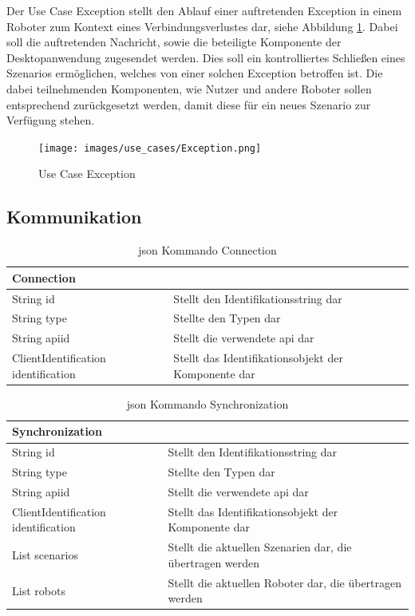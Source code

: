Der Use Case Exception stellt den Ablauf einer auftretenden Exception in einem Roboter zum Kontext eines Verbindungsverlustes dar, siehe Abbildung \ref{fig:Exception}. Dabei soll die auftretenden Nachricht, sowie die beteiligte Komponente der Desktopanwendung zugesendet werden. Dies soll ein kontrolliertes Schließen eines Szenarios ermöglichen, welches von einer solchen Exception betroffen ist. Die dabei teilnehmenden Komponenten, wie Nutzer und andere Roboter sollen entsprechend zurückgesetzt werden, damit diese für ein neues Szenario zur Verfügung stehen.\\

\begin{figure}[h]
	\begin{center}
		\texttt{[image: images/use\_cases/Exception.png]}
	\end{center}
	\caption{Use Case Exception}
	\label{fig:Exception}
\end{figure}

\newpage
\color{process}
\subsection{Kommunikation}

\begin{table}[h]
	\centering
	\begin{tabular}{|p{4cm}|p{10cm}|}
		\hline
		\textbf{Connection} & \\
		\hline
		String id & Stellt den Identifikationsstring dar \\
		String type & Stellte den Typen dar \\
		String apiid & Stellt die verwendete \gls{api} dar \\
		ClientIdentification identification & Stellt das Identifikationsobjekt der Komponente dar \\
		\hline
	\end{tabular}
	\caption[\gls{json} Kommando Connection]{\gls{json} Kommando Connection}
	\label{tab:Connection}
\end{table}

\begin{table}[h]
	\centering
	\begin{tabular}{|p{4cm}|p{10cm}|}
		\hline
		\textbf{Synchronization} & \\
		\hline
		String id & Stellt den Identifikationsstring dar \\
		String type & Stellte den Typen dar \\
		String apiid & Stellt die verwendete \gls{api} dar \\
		ClientIdentification identification & Stellt das Identifikationsobjekt der Komponente dar \\
		List scenarios & Stellt die aktuellen Szenarien dar, die übertragen werden\\
		List robots & Stellt die aktuellen Roboter dar, die übertragen werden \\
		\hline
	\end{tabular}
	\caption[\gls{json} Kommando Synchronization]{\gls{json} Kommando Synchronization}
	\label{tab:Synchronization}
\end{table}


